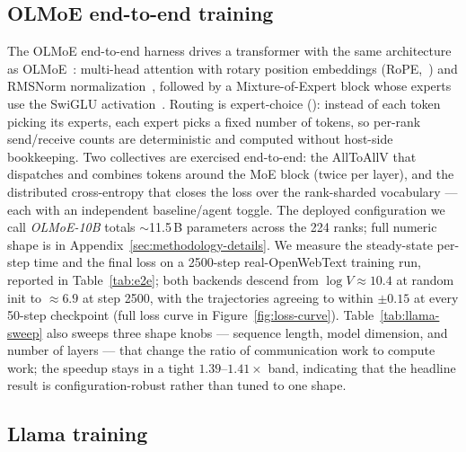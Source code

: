 \subsection{OLMoE end-to-end training}
\label{sec:eval-olmoe}

The OLMoE end-to-end harness drives a transformer with the same
architecture as OLMoE~\cite{muennighoff2024olmoe}: multi-head
attention with rotary position embeddings
(RoPE,~\cite{su2024roformer}) and RMSNorm
normalization~\cite{zhang2019rmsnorm}, followed by a
Mixture-of-Expert block whose experts use the SwiGLU
activation~\cite{shazeer2020glu}. Routing is expert-choice
(\cite{zhou2022expertchoice}): instead of each token picking its
experts, each expert picks a fixed number of tokens, so per-rank
send/receive counts are deterministic and computed without
host-side bookkeeping. Two collectives are exercised end-to-end:
the AllToAllV that dispatches and combines tokens around the
MoE block (twice per layer), and the distributed cross-entropy
that closes the loss over the rank-sharded vocabulary --- each
with an independent baseline/agent toggle. The deployed
configuration we call \emph{OLMoE-10B} totals
$\sim$11.5\,B parameters across the 224 ranks; full numeric
shape is in Appendix~\ref{sec:methodology-details}. We measure
the steady-state per-step time and the final loss on a
2500-step real-OpenWebText training run, reported in
Table~\ref{tab:e2e}; both backends descend from
$\log V \approx 10.4$ at random init to $\approx 6.9$ at step
2500, with the trajectories agreeing to within $\pm 0.15$ at
every 50-step checkpoint (full loss curve in
Figure~\ref{fig:loss-curve}). Table~\ref{tab:llama-sweep} also
sweeps three shape knobs --- sequence length, model dimension,
and number of layers --- that change the ratio of communication
work to compute work; the speedup stays in a tight
$1.39$--$1.41\times$ band, indicating that the headline result
is configuration-robust rather than tuned to one shape.


\subsection{Llama training}
\label{sec:eval-llama}

